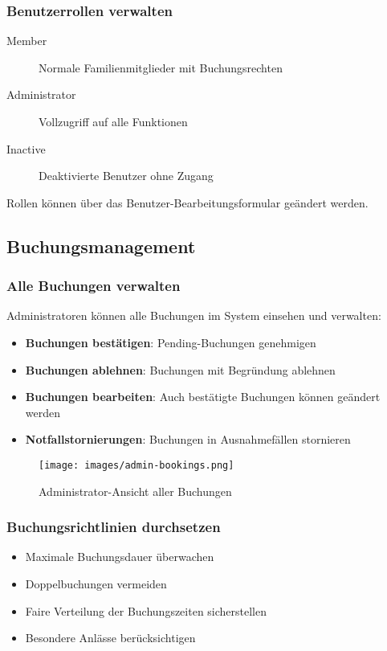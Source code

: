 \subsubsection{Benutzerrollen verwalten}

\begin{description}
    \item[Member] Normale Familienmitglieder mit Buchungsrechten
    \item[Administrator] Vollzugriff auf alle Funktionen
    \item[Inactive] Deaktivierte Benutzer ohne Zugang
\end{description}

Rollen können über das Benutzer-Bearbeitungsformular geändert werden.

\subsection{Buchungsmanagement}

\subsubsection{Alle Buchungen verwalten}

Administratoren können alle Buchungen im System einsehen und verwalten:

\begin{itemize}
    \item \textbf{Buchungen bestätigen}: Pending-Buchungen genehmigen
    \item \textbf{Buchungen ablehnen}: Buchungen mit Begründung ablehnen
    \item \textbf{Buchungen bearbeiten}: Auch bestätigte Buchungen können geändert werden
    \item \textbf{Notfallstornierungen}: Buchungen in Ausnahmefällen stornieren
\end{itemize}

\begin{figure}[H]
    \centering
    \texttt{[image: images/admin-bookings.png]}
    \caption{Administrator-Ansicht aller Buchungen}
    \label{fig:admin-bookings}
\end{figure}

\subsubsection{Buchungsrichtlinien durchsetzen}

\begin{itemize}
    \item Maximale Buchungsdauer überwachen
    \item Doppelbuchungen vermeiden
    \item Faire Verteilung der Buchungszeiten sicherstellen
    \item Besondere Anlässe berücksichtigen
\end{itemize}

